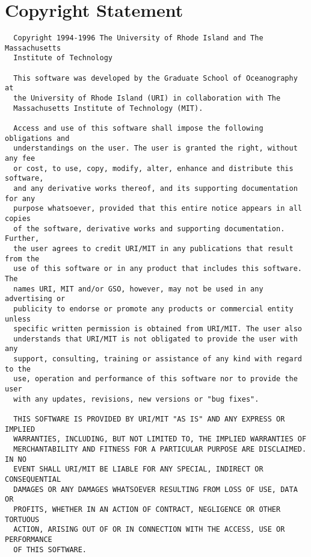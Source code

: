 \appendix

\section{Copyright Statement}
\label{walk:copyright}
\begin{verbatim}
  Copyright 1994-1996 The University of Rhode Island and The Massachusetts
  Institute of Technology

  This software was developed by the Graduate School of Oceanography at
  the University of Rhode Island (URI) in collaboration with The
  Massachusetts Institute of Technology (MIT).

  Access and use of this software shall impose the following obligations and
  understandings on the user. The user is granted the right, without any fee
  or cost, to use, copy, modify, alter, enhance and distribute this software,
  and any derivative works thereof, and its supporting documentation for any
  purpose whatsoever, provided that this entire notice appears in all copies
  of the software, derivative works and supporting documentation.  Further,
  the user agrees to credit URI/MIT in any publications that result from the
  use of this software or in any product that includes this software. The
  names URI, MIT and/or GSO, however, may not be used in any advertising or
  publicity to endorse or promote any products or commercial entity unless
  specific written permission is obtained from URI/MIT. The user also
  understands that URI/MIT is not obligated to provide the user with any
  support, consulting, training or assistance of any kind with regard to the
  use, operation and performance of this software nor to provide the user
  with any updates, revisions, new versions or "bug fixes".

  THIS SOFTWARE IS PROVIDED BY URI/MIT "AS IS" AND ANY EXPRESS OR IMPLIED
  WARRANTIES, INCLUDING, BUT NOT LIMITED TO, THE IMPLIED WARRANTIES OF
  MERCHANTABILITY AND FITNESS FOR A PARTICULAR PURPOSE ARE DISCLAIMED. IN NO
  EVENT SHALL URI/MIT BE LIABLE FOR ANY SPECIAL, INDIRECT OR CONSEQUENTIAL
  DAMAGES OR ANY DAMAGES WHATSOEVER RESULTING FROM LOSS OF USE, DATA OR
  PROFITS, WHETHER IN AN ACTION OF CONTRACT, NEGLIGENCE OR OTHER TORTUOUS
  ACTION, ARISING OUT OF OR IN CONNECTION WITH THE ACCESS, USE OR PERFORMANCE
  OF THIS SOFTWARE.

\end{verbatim}


